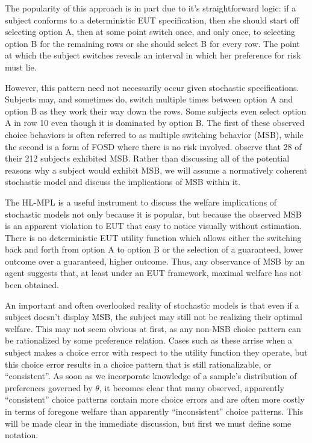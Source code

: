 \documentclass[../main.tex]{subfiles}
\begin{document}
The popularity of this approach is in part due to it's straightforward logic:
if a subject conforms to a deterministic EUT specification, then she should start off selecting option A, then at some point switch once, and only once, to selecting option B for the remaining rows or she should select B for every row.
The point at which the subject switches reveals an interval in which her preference for risk must lie.

However, this pattern need not necessarily occur given stochastic specifications.
Subjects may, and sometimes do, switch multiple times between option A and option B as they work their way down the rows.
Some subjects even select option A in row 10 even though it is dominated by option B.
The first of these observed choice behaviors is often referred to as multiple switching behavior (MSB), while the second is a form of FOSD where there is no risk involved.
\textcite[1647]{Holt2002} observe that 28 of their 212 subjects exhibited MSB.
Rather than discussing all of the potential reasons why a subject would exhibit MSB, we will assume a normatively coherent stochastic model and discuss the implications of MSB within it.

The HL-MPL is a useful instrument to discuss the welfare implications of stochastic models not only because it is popular, but because the observed MSB is an apparent violation to EUT that easy to notice visually without estimation.
There is no deterministic EUT utility function which allows either the switching back and forth from option A to option B or the selection of a guaranteed, lower outcome over a guaranteed, higher outcome.
Thus, any observance of MSB by an agent suggests that, at least under an EUT framework, maximal welfare has not been obtained.

An important and often overlooked reality of stochastic models is that even if a subject doesn't display MSB, the subject may still not be realizing their optimal welfare.
This may not seem obvious at first, as any non-MSB choice pattern can be rationalized by some preference relation.
Cases such as these arrise when a subject makes a choice error with respect to the utility function they operate, but this choice error results in a choice pattern that is still rationalizable, or \enquote{consistent}.
As soon as we incorporate knowledge of a sample's distribution of preferences governed by $\theta$, it becomes clear that many observed, apparently \enquote{consistent} choice patterns contain more choice errors and are often more costly in terms of foregone welfare than apparently \enquote{inconsistent} choice patterns.
This will be made clear in the immediate discussion, but first we must define some notation.
\end{document}
